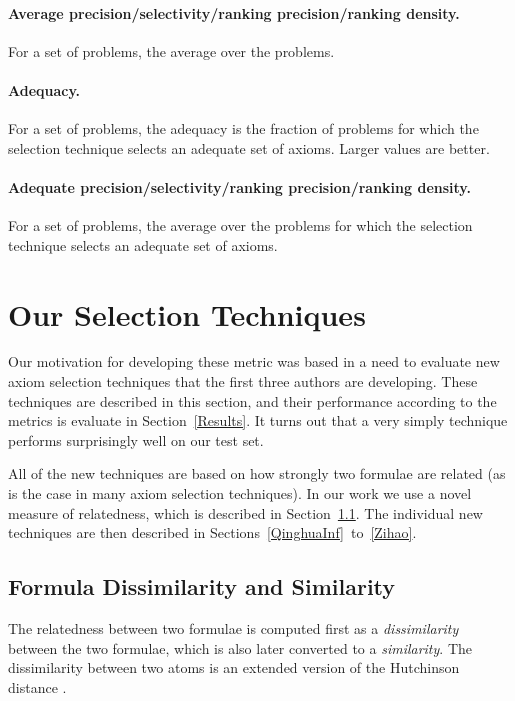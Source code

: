\documentclass[EPiC]{easychair}
\begin{document}
\paragraph{Average precision/selectivity/ranking precision/ranking density.}
For a set of problems, the average over the problems.

\paragraph{Adequacy.}
For a set of problems, the adequacy is the fraction of problems for which
the selection technique selects an adequate set of axioms.
Larger values are better.

\paragraph{Adequate precision/selectivity/ranking precision/ranking density.}
For a set of problems, the average over the problems for which the selection 
technique selects an adequate set of axioms.

\section{Our Selection Techniques}
\label{Ours}

Our motivation for developing these metric was based in a need to evaluate
new axiom selection techniques that the first three authors are developing.
These techniques are described in this section, and their performance
according to the metrics is evaluate in Section~\ref{Results}.
It turns out that a very simply technique performs surprisingly well
on our test set.

All of the new techniques are based on how strongly two formulae are
related (as is the case in many axiom selection techniques).
In our work we use a novel measure of relatedness, which is described
in Section~\ref{QinghuaDistance}.
The individual new techniques are then described in 
Sections~\ref{QinghuaInf}~to~\ref{Zihao}.

\subsection{Formula Dissimilarity and Similarity}
\label{QinghuaDistance}

The relatedness between two formulae is computed first as a
\emph{dissimilarity} between the two formulae, which is also later converted
to a \emph{similarity}.
The dissimilarity between two atoms is an extended version of the
Hutchinson distance \cite{Hut97}.
\end{document}
